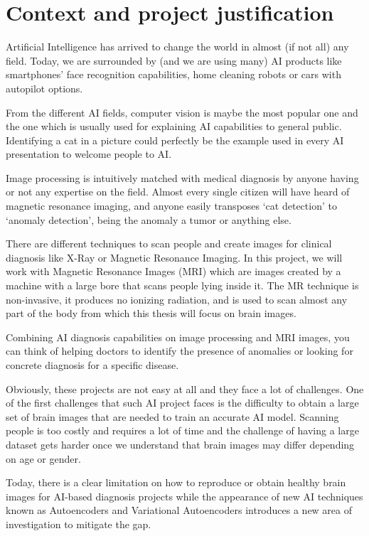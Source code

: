 \section{Context and project justification}

Artificial Intelligence has arrived to change the world in almost (if not all) any field. Today, we are surrounded by (and we are using many) AI products like smartphones’ face recognition capabilities, home cleaning robots or cars with autopilot options.

From the different AI fields, computer vision is maybe the most popular one and the one which is usually used for explaining AI capabilities to general public. Identifying a cat in a picture could perfectly be the example used in every AI presentation to welcome people to AI.

Image processing is intuitively matched with medical diagnosis by anyone having or not any expertise on the field. Almost every single citizen will have heard of magnetic resonance imaging, and anyone easily transposes ‘cat detection’ to ‘anomaly detection’, being the anomaly a tumor or anything else.

There are different techniques to scan people and create images for clinical diagnosis like X-Ray or Magnetic Resonance Imaging. In this project, we will work with Magnetic Resonance Images (MRI) which are images created by a machine with a large bore that scans people lying inside it. The MR technique is non-invasive, it produces no ionizing radiation, and is used to scan almost any part of the body from which this thesis will focus on brain images.

Combining AI diagnosis capabilities on image processing and MRI images, you can think of helping doctors to identify the presence of anomalies or looking for concrete diagnosis for a specific disease.

Obviously, these projects are not easy at all and they face a lot of challenges. One of the first challenges that such AI project faces is the difficulty to obtain a large set of brain images that are needed to train an accurate AI model. Scanning people is too costly and requires a lot of time and the challenge of having a large dataset gets harder once we understand that brain images may differ depending on age or gender.

Today, there is a clear limitation on how to reproduce or obtain healthy brain images for AI-based diagnosis projects while the appearance of new AI techniques known as Autoencoders and Variational Autoencoders introduces a new area of investigation to mitigate the gap.

